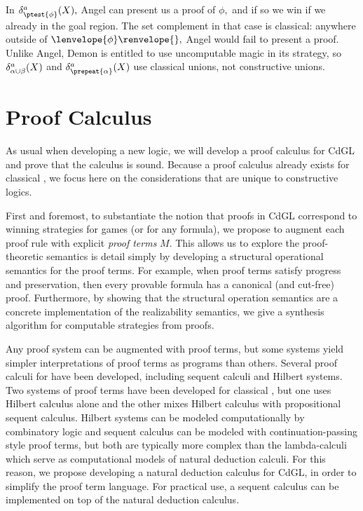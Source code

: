 \documentclass[12pt]{cmuthesis}
\theoremstyle{definition}
\theoremstyle{remark}
\newcommand{\CdGL}{\textsf{CdGL}\xspace}
\newcommand{\fint}[1]{\lenvelope{#1}\renvelope}
\begin{document}


In $\dstrategyforR[\ptest{\phi}]{\aa}{X},$ Angel can present us a proof of $\phi,$ and if so we win if we already in the goal region.
The set complement in that case is classical: anywhere outside of $\fint{\phi}{},$ Angel would fail to present a proof.
Unlike Angel, Demon is entitled to use uncomputable magic in its strategy, so $\dstrategyforR[\alpha\cup\beta]{\aa}{X}$ and $\dstrategyforR[\prepeat{\alpha}]{\aa}{X}$ use classical unions, not constructive unions.


\section{Proof Calculus}
\newcommand{\proves}[3]{#1 \vdash #2\mathop{:}#3}
As usual when developing a new logic, we will develop a proof calculus for \CdGL and prove that the calculus is sound.
Because a proof calculus already exists for classical \dGL, we focus here on the considerations that are unique to constructive logics.

First and foremost, to substantiate the notion that proofs in \CdGL correspond to winning strategies for games (or for any formula), we propose to augment each proof rule with explicit \emph{proof terms} $M$.
This allows us to explore the proof-theoretic semantics is detail simply by developing a structural operational semantics for the proof terms.
For example, when proof terms satisfy progress and preservation, then every provable formula has a canonical (and cut-free) proof.
Furthermore, by showing that the structural operation semantics are a concrete implementation of the realizability semantics, we give a synthesis algorithm for computable strategies from proofs.

Any proof system can be augmented with proof terms, but some systems yield simpler interpretations of proof terms as programs than others.
Several proof calculi for \dL have been developed, including sequent calculi and Hilbert systems.
Two systems of proof terms have been developed for classical \dL, but one uses Hilbert calculus alone and the other mixes Hilbert calculus with propositional sequent calculus.
Hilbert systems can be modeled computationally by combinatory logic and sequent calculus can be modeled with continuation-passing style proof terms, but both are typically more complex than the lambda-calculi which serve as computational models of natural deduction calculi.
For this reason, we propose developing a natural deduction calculus for \CdGL, in order to simplify the proof term language.
For practical use, a sequent calculus can be implemented on top of the natural deduction calculus.
\end{document}
